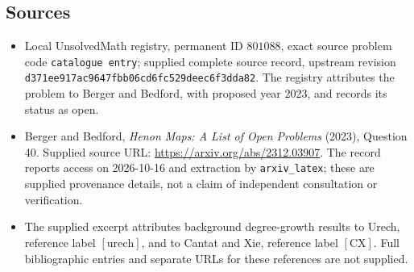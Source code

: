 \documentclass[11pt]{article}
\begin{document}
\subsection{Sources}
\begin{itemize}
\item Local UnsolvedMath registry, permanent ID \(801088\), exact source problem code \texttt{catalogue entry}; supplied complete source record, upstream revision \texttt{d371ee917ac9647fbb06cd6fc529deec6f3dda82}. The registry attributes the problem to Berger and Bedford, with proposed year 2023, and records its status as open.
\item Berger and Bedford, \emph{Henon Maps: A List of Open Problems} (2023), Question 40. Supplied source URL: \url{https://arxiv.org/abs/2312.03907}. The record reports access on 2026-10-16 and extraction by \texttt{arxiv\_latex}; these are supplied provenance details, not a claim of independent consultation or verification.
\item The supplied excerpt attributes background degree-growth results to Urech, reference label \([\mathrm{urech}]\), and to Cantat and Xie, reference label \([\mathrm{CX}]\). Full bibliographic entries and separate URLs for these references are not supplied.
\end{itemize}
\end{document}
